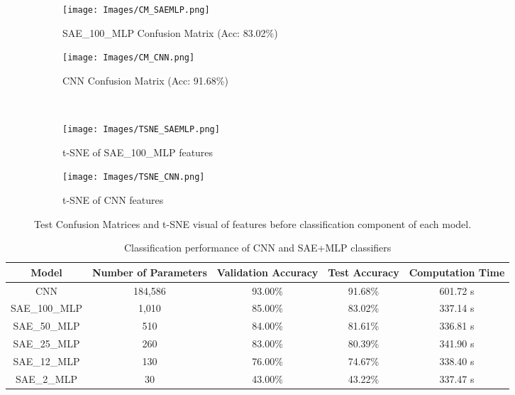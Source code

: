 \documentclass[conference]{IEEEtran}
\begin{document}
\begin{figure*}[htb!]
	\begin{subfigure}{.49\textwidth}{
			\texttt{[image: Images/CM\_SAEMLP.png]}
			\caption{SAE\_100\_MLP Confusion Matrix (Acc: 83.02\%)}
			\label{fig:CM_SAEMLP}
		}
	\end{subfigure}
	\begin{subfigure}{.49\textwidth}{
			\texttt{[image: Images/CM\_CNN.png]}
			\caption{CNN Confusion Matrix (Acc: 91.68\%)}
			\label{fig:CM_CNN}
		}
	\end{subfigure}
~
	\begin{subfigure}{.49\textwidth}{
		\texttt{[image: Images/TSNE\_SAEMLP.png]}
		\caption{t-SNE of SAE\_100\_MLP features}
		\label{fig:TSNE_SAEMLP}
	}
\end{subfigure}
\begin{subfigure}{.49\textwidth}{
		\texttt{[image: Images/TSNE\_CNN.png]}
		\caption{t-SNE of CNN features}
		\label{fig:TSNE_CNN}
	}
\end{subfigure}
	
	\caption{Test Confusion Matrices and t-SNE visual of features before classification component of each model.}
	\centering
	\label{fig:NonIT}
\end{figure*}


\begin{table*}[htb!]
	\centering
	\caption{Classification performance of CNN and SAE+MLP classifiers}
	\label{tab:Method1}
	\begin{tabular}{|c|c|c|c|c|}
		\hline
		Model         & Number of Parameters & Validation Accuracy & Test Accuracy & Computation Time \\ \hline
		CNN           & 184,586              & 93.00\%             & 91.68\%       & 601.72 s         \\ \hline
		SAE\_100\_MLP & 1,010                & 85.00\%             & 83.02\%       & 337.14 s         \\ \hline
		SAE\_50\_MLP  & 510                  & 84.00\%             & 81.61\%       & 336.81 s         \\ \hline
		SAE\_25\_MLP  & 260                  & 83.00\%             & 80.39\%       & 341.90 s         \\ \hline
		SAE\_12\_MLP  & 130                  & 76.00\%             & 74.67\%       & 338.40 s         \\ \hline
		SAE\_2\_MLP   & 30                   & 43.00\%             & 43.22\%       & 337.47 s         \\ \hline
	\end{tabular}
\end{table*}
\end{document}
